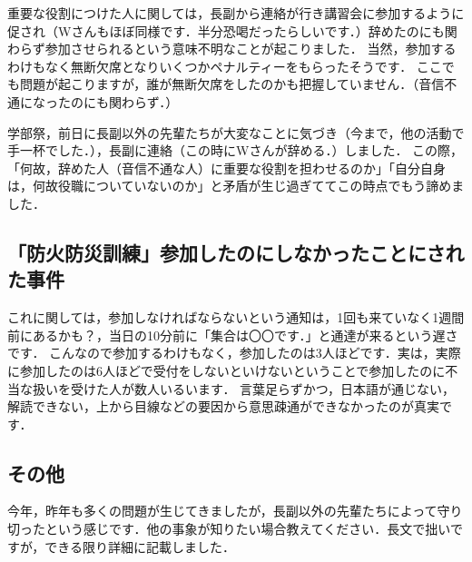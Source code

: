 \documentclass[a4paper,11pt]{ltjsarticle}
\begin{document}
重要な役割につけた人に関しては，長副から連絡が行き講習会に参加するように促され（Wさんもほぼ同様です．半分恐喝だったらしいです．）辞めたのにも関わらず参加させられるという意味不明なことが起こりました．
当然，参加するわけもなく無断欠席となりいくつかペナルティーをもらったそうです．
ここでも問題が起こりますが，誰が無断欠席をしたのかも把握していません．（音信不通になったのにも関わらず．）

学部祭，前日に長副以外の先輩たちが大変なことに気づき（今まで，他の活動で手一杯でした．），長副に連絡（この時にWさんが辞める．）しました．
この際，「何故，辞めた人（音信不通な人）に重要な役割を担わせるのか」「自分自身は，何故役職についていないのか」と矛盾が生じ過ぎててこの時点でもう諦めました．

\subsection{「防火防災訓練」参加したのにしなかったことにされた事件}

これに関しては，参加しなければならないという通知は，1回も来ていなく1週間前にあるかも？，当日の10分前に「集合は〇〇です．」と通達が来るという遅さです．
こんなので参加するわけもなく，参加したのは3人ほどです．実は，実際に参加したのは6人ほどで受付をしないといけないということで参加したのに不当な扱いを受けた人が数人いるいます．
言葉足らずかつ，日本語が通じない，解読できない，上から目線などの要因から意思疎通ができなかったのが真実です．

\subsection{その他}

今年，昨年も多くの問題が生じてきましたが，長副以外の先輩たちによって守り切ったという感じです．他の事象が知りたい場合教えてください．長文で拙いですが，できる限り詳細に記載しました．
\end{document}
